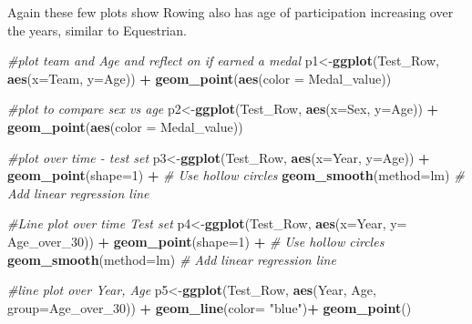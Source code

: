 \documentclass[]{article}
\newenvironment{Shaded}{\begin{snugshade}}{\end{snugshade}}
\newcommand{\KeywordTok}[1]{\textcolor[rgb]{0.13,0.29,0.53}{\textbf{#1}}}
\newcommand{\DataTypeTok}[1]{\textcolor[rgb]{0.13,0.29,0.53}{#1}}
\newcommand{\DecValTok}[1]{\textcolor[rgb]{0.00,0.00,0.81}{#1}}
\newcommand{\StringTok}[1]{\textcolor[rgb]{0.31,0.60,0.02}{#1}}
\newcommand{\CommentTok}[1]{\textcolor[rgb]{0.56,0.35,0.01}{\textit{#1}}}
\newcommand{\OperatorTok}[1]{\textcolor[rgb]{0.81,0.36,0.00}{\textbf{#1}}}
\newcommand{\NormalTok}[1]{#1}
\begin{document}
Again these few plots show Rowing also has age of participation
increasing over the years, similar to Equestrian.

\begin{Shaded}
\begin{Highlighting}[]
\CommentTok{#plot team and Age and reflect on if earned a medal}
\NormalTok{p1<-}\KeywordTok{ggplot}\NormalTok{(Test_Row, }\KeywordTok{aes}\NormalTok{(}\DataTypeTok{x=}\NormalTok{Team, }\DataTypeTok{y=}\NormalTok{Age)) }\OperatorTok{+}
\StringTok{  }\KeywordTok{geom_point}\NormalTok{(}\KeywordTok{aes}\NormalTok{(}\DataTypeTok{color =}\NormalTok{ Medal_value))}

\CommentTok{#plot to compare sex vs age}
\NormalTok{p2<-}\KeywordTok{ggplot}\NormalTok{(Test_Row, }\KeywordTok{aes}\NormalTok{(}\DataTypeTok{x=}\NormalTok{Sex, }\DataTypeTok{y=}\NormalTok{Age)) }\OperatorTok{+}
\StringTok{  }\KeywordTok{geom_point}\NormalTok{(}\KeywordTok{aes}\NormalTok{(}\DataTypeTok{color =}\NormalTok{ Medal_value))}

\CommentTok{#plot over time - test set}
\NormalTok{p3<-}\KeywordTok{ggplot}\NormalTok{(Test_Row, }\KeywordTok{aes}\NormalTok{(}\DataTypeTok{x=}\NormalTok{Year, }\DataTypeTok{y=}\NormalTok{Age)) }\OperatorTok{+}
\StringTok{  }\KeywordTok{geom_point}\NormalTok{(}\DataTypeTok{shape=}\DecValTok{1}\NormalTok{) }\OperatorTok{+}\StringTok{    }\CommentTok{# Use hollow circles}
\StringTok{  }\KeywordTok{geom_smooth}\NormalTok{(}\DataTypeTok{method=}\NormalTok{lm)    }\CommentTok{# Add linear regression line }

 
\CommentTok{#Line plot over time Test set}
\NormalTok{p4<-}\KeywordTok{ggplot}\NormalTok{(Test_Row, }\KeywordTok{aes}\NormalTok{(}\DataTypeTok{x=}\NormalTok{Year, }\DataTypeTok{y=}\NormalTok{ Age_over_}\DecValTok{30}\NormalTok{)) }\OperatorTok{+}
\StringTok{  }\KeywordTok{geom_point}\NormalTok{(}\DataTypeTok{shape=}\DecValTok{1}\NormalTok{) }\OperatorTok{+}\StringTok{    }\CommentTok{# Use hollow circles}
\StringTok{  }\KeywordTok{geom_smooth}\NormalTok{(}\DataTypeTok{method=}\NormalTok{lm)    }\CommentTok{# Add linear regression line }

\CommentTok{#line plot over Year, Age}
\NormalTok{p5<-}\KeywordTok{ggplot}\NormalTok{(Test_Row, }\KeywordTok{aes}\NormalTok{(Year, Age, }\DataTypeTok{group=}\NormalTok{Age_over_}\DecValTok{30}\NormalTok{)) }\OperatorTok{+}
\StringTok{  }\KeywordTok{geom_line}\NormalTok{(}\DataTypeTok{color=} \StringTok{"blue"}\NormalTok{)}\OperatorTok{+}
\StringTok{  }\KeywordTok{geom_point}\NormalTok{() }


\end{Highlighting}
\end{Shaded}
\end{document}
